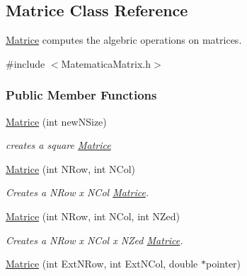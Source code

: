 \hypertarget{classMatrice}{}\subsection{Matrice Class Reference}
\label{classMatrice}


\hyperlink{classMatrice}{Matrice} computes the algebric operations on matrices.  




{\ttfamily \#include $<$Matematica\+Matrix.\+h$>$}

\subsubsection*{Public Member Functions}
\begin{DoxyCompactItemize}
\item 
\hyperlink{classMatrice_ae82949ca87c5bb80e83c4c3b5b384ccb}{Matrice} (int new\+N\+Size)\hypertarget{classMatrice_ae82949ca87c5bb80e83c4c3b5b384ccb}{}\label{classMatrice_ae82949ca87c5bb80e83c4c3b5b384ccb}

\begin{DoxyCompactList}\small\item\em creates a square \hyperlink{classMatrice}{Matrice} \end{DoxyCompactList}\item 
\hyperlink{classMatrice_ad89ff6ea9c7c65c60696b6476c5a48fa}{Matrice} (int N\+Row, int N\+Col)\hypertarget{classMatrice_ad89ff6ea9c7c65c60696b6476c5a48fa}{}\label{classMatrice_ad89ff6ea9c7c65c60696b6476c5a48fa}

\begin{DoxyCompactList}\small\item\em Creates a N\+Row x N\+Col \hyperlink{classMatrice}{Matrice}. \end{DoxyCompactList}\item 
\hyperlink{classMatrice_a27514cb639bd3d69242f74cee8146b25}{Matrice} (int N\+Row, int N\+Col, int N\+Zed)\hypertarget{classMatrice_a27514cb639bd3d69242f74cee8146b25}{}\label{classMatrice_a27514cb639bd3d69242f74cee8146b25}

\begin{DoxyCompactList}\small\item\em Creates a N\+Row x N\+Col x N\+Zed \hyperlink{classMatrice}{Matrice}. \end{DoxyCompactList}\item 
\hyperlink{classMatrice_a7c59f8c564cd59391ed6198a75dfd398}{Matrice} (int Ext\+N\+Row, int Ext\+N\+Col, double $\ast$pointer)\hypertarget{classMatrice_a7c59f8c564cd59391ed6198a75dfd398}{}\label{classMatrice_a7c59f8c564cd59391ed6198a75dfd398}


\end{DoxyCompactItemize}
